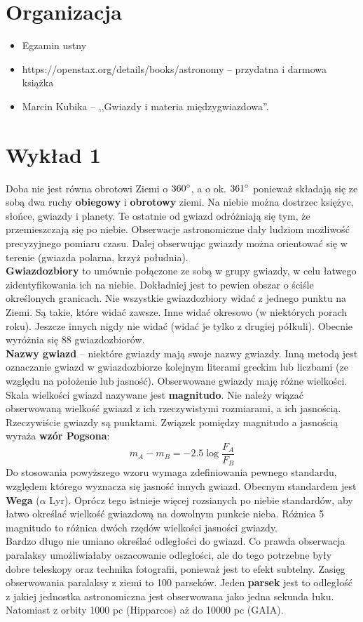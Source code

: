 \documentclass[../index.tex]{subfiles}
\begin{document}
    \section{Organizacja}
        \begin{itemize}
            \item Egzamin ustny
            \item https://openstax.org/details/books/astronomy \--- przydatna i darmowa książka
            \item Marcin Kubika \--- ,,Gwiazdy i materia międzygwiazdowa''.
        \end{itemize}
    \section{Wykład 1}
        Doba nie jest równa obrotowi Ziemi o \(360^\circ\), a o ok. \(361^\circ\) ponieważ składają się ze sobą dwa ruchy \textbf{obiegowy} i \textbf{obrotowy} ziemi. Na niebie można dostrzec księżyc, słońce, gwiazdy i planety. Te ostatnie od gwiazd odróżniają się tym, że przemieszczają się po niebie. Obserwacje astronomiczne dały ludziom możliwość precyzyjnego pomiaru czasu. Dalej obserwując gwiazdy można orientować się w terenie (gwiazda polarna, krzyż południa).\\
        \textbf{Gwiazdozbiory} to umównie połączone ze sobą w grupy gwiazdy, w celu łatwego zidentyfikowania ich na niebie. Dokładniej jest to pewien obszar o ściśle określonych granicach. Nie wszystkie gwiazdozbiory widać z jednego punktu na Ziemi. Są takie, które widać zawsze. Inne widać okresowo (w niektórych porach roku). Jeszcze innych nigdy nie widać (widać je tylko z drugiej półkuli). Obecnie wyróżnia się 88 gwiazdozbiorów. \\
        \textbf{Nazwy gwiazd} \--- niektóre gwiazdy mają swoje nazwy gwiazdy. Inną metodą jest oznaczanie gwiazd w gwiazdozbiorze kolejnym literami greckim lub liczbami (ze względu na położenie lub jasność).
        Obserwowane gwiazdy maję różne wielkości. Skala wielkości gwiazd nazywane jest \textbf{magnitudo}. Nie należy wiązać obserwowaną wielkość gwiazd z ich rzeczywistymi rozmiarami, a ich jasnością. Rzeczywiście gwiazdy są punktami. Związek pomiędzy magnitudo a jasnością wyraża \textbf{wzór Pogsona}:
        \begin{equation}
            m_A - m_B = - 2.5 \log \frac{F_A}{F_B} 
        \end{equation} 
        Do stosowania powyższego wzoru wymaga zdefiniowania pewnego standardu, względem którego wyznacza się jasność innych gwiazd. Obecnym standardem jest \textbf{Wega} (\(\alpha\)\! Lyr). Oprócz tego istnieje więcej rozsianych po niebie standardów, aby łatwo określać wielkość gwiazdową na dowolnym punkcie nieba. Różnica 5 magnitudo to różnica dwóch rzędów wielkości jasności gwiazdy.\\
        Bardzo długo nie umiano określać odległości do gwiazd. Co prawda obserwacja paralaksy umożliwiałaby oszacowanie odległości, ale do tego potrzebne były dobre teleskopy oraz technika fotografii, ponieważ jest to efekt subtelny. Zasięg obserwowania paralaksy z ziemi to 100 parseków. Jeden \textbf{parsek} jest to odległość z jakiej jednostka astronomiczna jest obserwowana jako jedna sekunda łuku. Natomiast z orbity 1000 pc (Hipparcos) aż do 10000 pc (GAIA).
\end{document}
